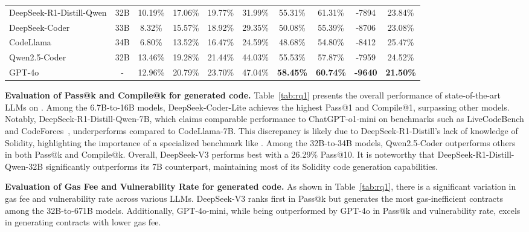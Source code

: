 \begin{table*}[htbp!]
{\begin{tabular}{lc|ccc|ccc|cc}
        DeepSeek-R1-Distill-Qwen & 32B & 10.19\% & 17.06\% & 19.77\% & 31.99\% & 55.31\% & 61.31\% & -7894& 23.84\%\\
        DeepSeek-Coder & 33B & 8.32\% & 15.57\% & 18.92\% & 29.35\% & 50.08\% & 55.39\% & -8706& 23.08\%\\
        CodeLlama & 34B & 6.80\% & 13.52\% & 16.47\% & 24.59\% & 48.68\% & 54.80\% & -8412& 25.47\%\\
        Qwen2.5-Coder & 32B & 13.46\% & 19.28\% & 21.44\% & 44.03\% &  55.53\% & 57.87\% & -7959& 24.52\% \\
        GPT-4o & - & 12.96\% & 20.79\% & 23.70\% & 47.04\% & \textbf{58.45\%}& \textbf{60.74\%} & \textbf{-9640}& \textbf{21.50\%}\\
        \bottomrule
        \end{tabular}%
    }
    \label{tab:rq1}%
\end{table*}%

\noindent 
\textbf{Evaluation of Pass@k and Compile@k for generated code.}
Table~\ref{tab:rq1} presents the overall performance of state-of-the-art LLMs on \datasetname. 
Among the 6.7B-to-16B models, DeepSeek-Coder-Lite achieves the highest Pass@1 and Compile@1, surpassing other models. 
Notably, DeepSeek-R1-Distill-Qwen-7B, which claims comparable performance to ChatGPT-o1-mini on benchmarks such as LiveCodeBench and CodeForces~\cite{deepseekr1}, underperforms compared to CodeLlama-7B. 
This discrepancy is likely due to DeepSeek-R1-Distill's lack of knowledge of Solidity, highlighting the importance of a specialized benchmark like \mytitle. 
Among the 32B-to-34B models, Qwen2.5-Coder outperforms others in both Pass@k and Compile@k.
Overall, DeepSeek-V3 performs best with a 26.29\% Pass@10.
It is noteworthy that DeepSeek-R1-Distill-Qwen-32B significantly outperforms its 7B counterpart, maintaining most of its Solidity code generation capabilities.


\noindent 
\textbf{Evaluation of Gas Fee and Vulnerability Rate for generated code.}
As shown in Table~\ref{tab:rq1}, there is a significant variation in gas fee and vulnerability rate across various LLMs. 
DeepSeek-V3 ranks first in Pass@k but generates the most gas-inefficient contracts among the 32B-to-671B models.
Additionally, GPT-4o-mini, while being outperformed by GPT-4o in Pass@k and vulnerability rate, excels in generating contracts with lower gas fee.